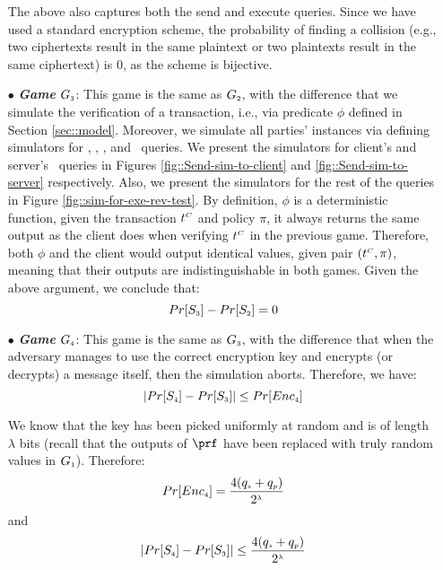 \begin{itemize}
The above also captures both the send and execute queries. Since we have used a standard encryption scheme, the probability of finding a collision (e.g., two ciphertexts result in the same plaintext or two plaintexts result in the same ciphertext) is $0$, as the scheme is bijective. 



\item[$\bullet$] \textit{\textbf{Game}}  $G_{\scriptscriptstyle  3}$: This game is the same as $G_{\scriptscriptstyle  2}$, with the difference that we simulate the verification of a transaction, i.e., via predicate $\phi$ defined in Section \ref{sec::model}. Moreover, we simulate all parties' instances via defining simulators for  \send, \execute, \reveal, and \test\ queries. We present the simulators for client's and server's \send\ queries in Figures \ref{fig::Send-sim-to-client} and \ref{fig::Send-sim-to-server} respectively. Also, we present the simulators for the rest of the queries in Figure \ref{fig::sim-for-exe-rev-test}. By definition,  $\phi$ is a deterministic function, given the transaction $t^{\scriptscriptstyle  C}$ and policy $\pi$, it always returns the same output as the client does when verifying $t^{\scriptscriptstyle  C}$ in the previous game.  Therefore, both $\phi$ and the client would output identical values, given pair $(t^{\scriptscriptstyle  C}, \pi)$, meaning that their outputs are indistinguishable in both games.  Given the above argument, we conclude that:  
%
\begin{equation}\label{eq::game_3}
Pr[S_{\scriptscriptstyle  3}]-Pr[S_{\scriptscriptstyle  2}]=0
\end{equation}
%
\item[$\bullet$] \textit{\textbf{Game}}  $G_{\scriptscriptstyle  4}$: This game is the same as $G_{\scriptscriptstyle  3}$, with the difference that when the adversary manages to use the correct encryption key and encrypts (or decrypts) a message itself, then the simulation aborts. Therefore, we have: 
%
\begin{equation*}
|Pr[S_{\scriptscriptstyle  4}]-Pr[S_{\scriptscriptstyle  3}]|\leq Pr[Enc_{\scriptscriptstyle  4}]
\end{equation*}


We know that the key has been picked uniformly at random and is of length $\lambda$ bits (recall that the outputs of $\prf$ have been replaced with truly random values in $G_{\scriptscriptstyle  1}$). Therefore:
%
 $$Pr[Enc_{\scriptscriptstyle  4}]=\frac{4(q_{\scriptscriptstyle  s}+q_{\scriptscriptstyle  p})}{2^{\scriptscriptstyle \lambda}}$$ and 
 \begin{equation}\label{eq::game_4}
 |Pr[S_{\scriptscriptstyle  4}]-Pr[S_{\scriptscriptstyle  3}]|\leq \frac{4(q_{\scriptscriptstyle  s}+q_{\scriptscriptstyle  p})}{2^{\scriptscriptstyle \lambda}}
 \end{equation}
%


\end{itemize}
